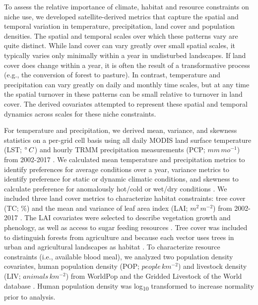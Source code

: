 To assess the relative importance of climate, habitat and resource constraints on niche use, we developed satellite-derived metrics that capture the spatial and temporal variation in temperature, precipitation, land cover and population densities. The spatial and temporal scales over which these patterns vary are quite distinct. While land cover can vary greatly over small spatial scales, it typically varies only minimally within a year in undisturbed landscapes. If land cover does change within a year, it is often the result of a transformative process (e.g., the conversion of forest to pasture). In contrast, temperature and precipitation can vary greatly on daily and monthly time scales, but at any time the spatial turnover in these patterns can be small relative to turnover in land cover. The derived covariates attempted to represent these spatial and temporal dynamics across scales for these niche constraints.

For temperature and precipitation, we derived mean, variance, and skewness statistics on a per-grid cell basis using all daily MODIS land surface temperature (LST; $\degree\, C$) and hourly TRMM precipitation measurements (PCP; $mm\, mo^{-1}$) from 2002-2017 \cite{Justice1998-pu, Huffman2007-iu, Hou2013-cn}. We calculated mean temperature and precipitation metrics to identify preferences for average conditions over a year, variance metrics to identify preference for static or dynamic climatic conditions, and skewness to calculate preference for anomalously hot/cold or wet/dry conditions \cite{Huffman2007-iu, Hou2013-cn}. We included three land cover metrics to characterize habitat constraints: tree cover (TC; $\%$) and the mean and variance of leaf area index (LAI; $m^{2}\, m^{-2}$) from 2002-2017 \cite{Justice1998-pu, Hansen2013-oz}. The LAI covariates were selected to describe vegetation growth and phenology, as well as access to sugar feeding resources \cite{Martinez-Ibarra1997-ra, Chen2015-dw}. Tree cover was included to distinguish forests from agriculture and because each vector uses trees in urban and agricultural landscapes as habitat \cite{Troyo2009-yv, Landau2012-dn}. To characterize resource constraints (i.e., available blood meal), we analyzed two population density covariates, human population density (POP; $people\, km^{-2}$) and livestock density (LIV; $animals\, km^{-2}$) from WorldPop and the Gridded Livestock of the World database \cite{Tatem2017-ma, Gilbert2018-bm}. Human population density was log\textsubscript{10} transformed to increase normality prior to analysis.

